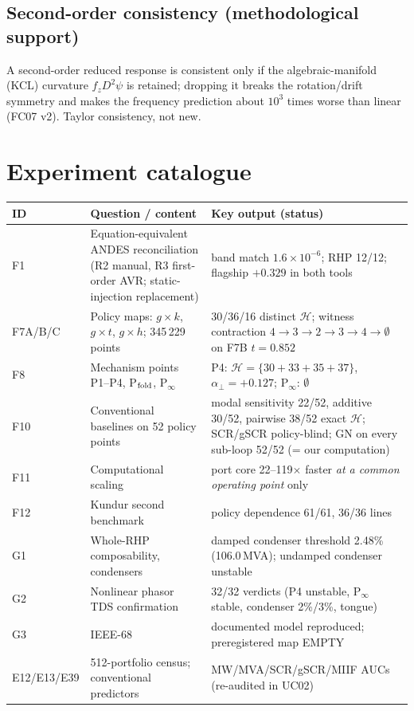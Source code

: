 \documentclass[10pt,a4paper]{article}
\theoremstyle{definition}
\newcommand{\Hy}{\mathcal{H}}
\newcommand{\aperp}{\alpha_\perp}
\begin{document}
\subsection{Second-order consistency (methodological support)}
A second-order reduced response is consistent only if the algebraic-manifold (KCL) curvature
$f_zD^2\psi$ is retained; dropping it breaks the rotation/drift symmetry and makes the frequency
prediction about $10^3$ times worse than linear (FC07 v2). Taylor consistency, not new.

\section{Experiment catalogue}\label{sec:exp}
\small
\begin{longtable}{@{}L{2.1cm}L{7.2cm}L{6.9cm}@{}}
\toprule
ID & Question / content & Key output (status)\\
\midrule\endhead
F1 & Equation-equivalent ANDES reconciliation (R2 manual, R3 first-order AVR; static-injection replacement) & band match $1.6\times10^{-6}$; RHP 12/12; flagship $+0.329$ in both tools\\
F7A/B/C & Policy maps: $g\times k$, $g\times t$, $g\times h$; 345\,229 points & 30/36/16 distinct $\Hy$; witness contraction $4\to3\to2\to3\to4\to\emptyset$ on F7B $t=0.852$\\
F8 & Mechanism points P1--P4, P$_{\rm fold}$, P$_\infty$ & P4: $\Hy=\{30{+}33{+}35{+}37\}$, $\aperp=+0.127$; P$_\infty$: $\emptyset$\\
F10 & Conventional baselines on 52 policy points & modal sensitivity 22/52, additive 30/52, pairwise 38/52 exact $\Hy$; SCR/gSCR policy-blind; GN on every sub-loop 52/52 (= our computation)\\
F11 & Computational scaling & port core 22--119$\times$ faster \emph{at a common operating point} only\\
F12 & Kundur second benchmark & policy dependence 61/61, 36/36 lines\\
G1 & Whole-RHP composability, condensers & damped condenser threshold 2.48\% (106.0\,MVA); undamped condenser unstable\\
G2 & Nonlinear phasor TDS confirmation & 32/32 verdicts (P4 unstable, P$_\infty$ stable, condenser 2\%/3\%, tongue)\\
G3 & IEEE-68 & documented model reproduced; preregistered map EMPTY\\
E12/E13/E39 & 512-portfolio census; conventional predictors & MW/MVA/SCR/gSCR/MIIF AUCs (re-audited in UC02)\\

\end{longtable}
\end{document}
